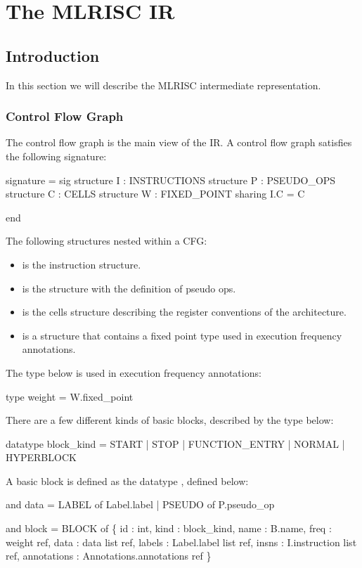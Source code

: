 \section{The MLRISC IR}
\subsection{Introduction}

In this section we will describe the MLRISC intermediate representation.

\subsubsection{Control Flow Graph}
The control flow graph is the main view of the IR.  
A control flow graph satisfies the following signature:
\begin{SML}
 signature  = sig
   structure I : INSTRUCTIONS
   structure P : PSEUDO_OPS
   structure C : CELLS
   structure W : FIXED_POINT 
      sharing I.C = C
   
 end
\end{SML}

The following structures nested within a CFG:
\begin{itemize}
   \item {} is the instruction structure.
   \item {} is the structure with the definition
of pseudo ops.
   \item {} is the cells structure describing the
register conventions of the architecture.
   \item {} is a structure that contains
a fixed point type used in execution frequency annotations.
\end{itemize}

The type  below is used in execution frequency annotations:
\begin{SML}
   type weight = W.fixed_point
\end{SML}

There are a few different kinds of basic blocks, described
by the type  below:
\begin{SML}
   datatype block_kind = 
       START          
     | STOP          
     | FUNCTION_ENTRY
     | NORMAL        
     | HYPERBLOCK   
\end{SML}

A basic block is defined as the datatype , defined below:
\begin{SML}
   and data = LABEL  of Label.label
            | PSEUDO of P.pseudo_op

   and block = 
      BLOCK of
      \{  id          : int,                      
         kind        : block_kind,                 
         name        : B.name,                    
         freq        : weight ref,                
         data        : data list ref,             
         labels      : Label.label list ref,     
         insns       : I.instruction list ref,     
         annotations : Annotations.annotations ref 
      \}
\end{SML}

